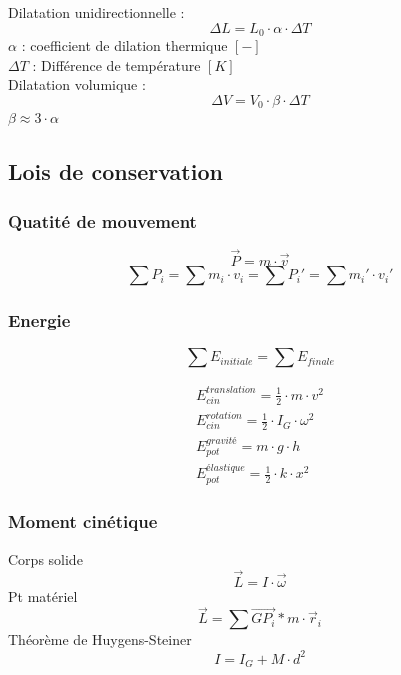 	
	Dilatation unidirectionnelle :
	\begin{equation}
	\Delta L=L_0 \cdot \alpha  \cdot \Delta T
	\end{equation}
	$\alpha$ : coefficient de dilation thermique $[-]$\\
	$\Delta T$ : Différence de température $[K]$\\
	
	Dilatation volumique : 
	\begin{equation}
	\Delta V=V_0 \cdot \beta \cdot \Delta T
	\end{equation}
	$\beta \approx 3\cdot \alpha$
	
	\subsection{Lois de conservation}
	\subsubsection{Quatité de mouvement}
	\begin{equation}
	\vec{P}=m \cdot \vec{v}
	\end{equation}
	\begin{equation}
	\sum P_{i}=\sum m_i \cdot v_i= \sum P_i '=\sum m_i ' \cdot v_i '
	\end{equation}
	\subsubsection{Energie}
	\begin{equation}
	\sum E_{initiale}=\sum E_{finale}
	\end{equation}
	
	\begin{eqnarray}
	E_{cin}^{translation}=\frac{1}{2} \cdot m \cdot v^2\\
	E_{cin}^{rotation}=\frac{1}{2} \cdot I_G \cdot \omega^2\\
	E_{pot}^{gravité}=m \cdot g \cdot h\\
	E_{pot}^{élastique}=\frac{1}{2} \cdot k \cdot x^2
	\end{eqnarray}
	
	\subsubsection{Moment cinétique}
	Corps solide
	\begin{equation}
	\vec{L}=I \cdot \vec{\omega}
	\end{equation}
	Pt matériel
	\begin{equation}
	\vec{L}=\sum \vec{GP_i}*m\cdot \vec{r}_i
	\end{equation}
	Théorème de Huygens-Steiner
	\begin{equation}
	I=I_G+M \cdot d^2
	\end{equation}
	
